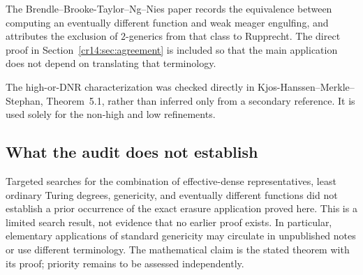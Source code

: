 \documentclass[11pt,a4paper]{article}
\theoremstyle{definition}
\theoremstyle{remark}
\begin{document}
The Brendle--Brooke-Taylor--Ng--Nies paper records the equivalence between
computing an eventually different function and weak meager engulfing, and
attributes the exclusion of $2$-generics from that class to Rupprecht.
The direct proof in Section~\ref{cr14:sec:agreement} is included so that the
main application does not depend on translating that terminology.\cite{BBNN}

The high-or-DNR characterization was checked directly in
Kjos-Hanssen--Merkle--Stephan, Theorem~5.1, rather than inferred only from a
secondary reference. It is used solely for the non-high and low
refinements.\cite{KMS}

\subsection{What the audit does not establish}
Targeted searches for the combination of effective-dense representatives,
least ordinary Turing degrees, genericity, and eventually different
functions did not establish a prior occurrence of the exact erasure
application proved here. This is a limited search result, not evidence
that no earlier proof exists. In particular, elementary applications of
standard genericity may circulate in unpublished notes or use different
terminology. The mathematical claim is the stated theorem with its proof;
priority remains to be assessed independently.
\end{document}
